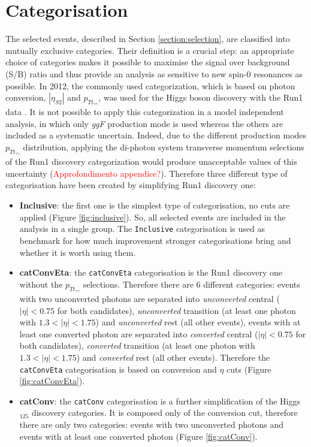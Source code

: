 \documentclass[a4paper, oneside, 11pt, openright]{book}
\begin{document}
 		\section{Categorisation}
 			The selected events, described in Section \ref{section:selection}, are classified into mutually exclusive categories. Their definition is a crucial step: an appropriate choice of categories makes it possible to maximise the signal over background (S/B) ratio and thus provide an analysis as sensitive to new spin-0 resonances as possible. In 2012, the commonly used categorization, which is based on photon conversion, $|\eta_{S2}|$ and $p_{Tt_{\gamma\gamma}}$, was used for the Higgs boson discovery with the Run1 data \cite{higgs_atlas}. It is not possible to apply this categorization in a model independent analysis, in which only \textit{ggF} production mode is used whereas the others are included as a systematic uncertain. Indeed, due to the different production modes $p_{Tt_{\gamma\gamma}}$ distribution, applying the di-photon system transverse momentum selections of the Run1 discovery categorization would produce unacceptable values of this uncertainty (\textcolor{red}{Approfondimento appendice?}). Therefore three different type of categorisation have been created by simplifying Run1 discovery one:
 			\begin{itemize}
 				\item \textbf{Inclusive}: the first one is the simplest type of categorisation, no cuts are applied (Figure \ref{fig:inclusive}). So, all selected events are included in the analysis in a single group. The \texttt{Inclusive} categorisation is used as benchmark for how much improvement stronger categorisations bring and whether it is worth using them. 
 				\item \textbf{catConvEta}: the \texttt{catConvEta} categorisation is the Run1 discovery one without the $p_{Tt_{\gamma\gamma}}$ selections. Therefore there are 6 different categories: events with two unconverted photons are separated into \textit{unconverted} central ($|\eta|<0.75$ for both candidates), \textit{unconverted} transition (at least one photon with $1.3<|\eta|<1.75$) and \textit{unconverted} rest (all other events), events with at least one converted photon are separated into \textit{converted} central ($|\eta|<0.75$ for both candidates), \textit{converted} transition (at least one photon with $1.3<|\eta|<1.75$) and \textit{converted} rest (all other events). Therefore the \texttt{catConvEta} categorisation is based on conversion and $\eta$ cuts (Figure \ref{fig:catConvEta}).
 				\item \textbf{catConv}: the \texttt{catConv} categorisation is a further simplification of the Higgs$_{125}$ discovery categories. It is composed only of the conversion cut, therefore there are only two categories: events with two unconverted photons and events with at least one converted photon (Figure \ref{fig:catConv}).
 			\end{itemize}
\end{document}

